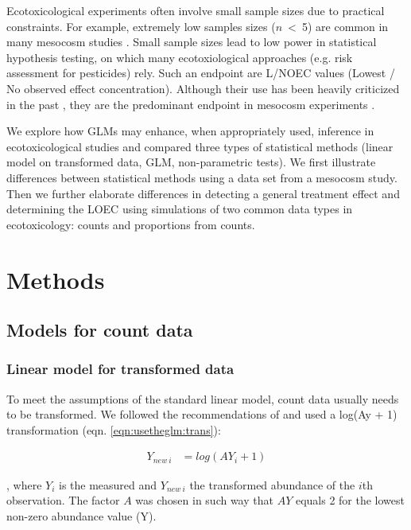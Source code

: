 Ecotoxicological experiments often involve small sample sizes due to practical constraints. 
For example, extremely low samples sizes ($n$~\textless~5) are common in many mesocosm studies \citep{sanderson_pesticide_2002,szocs_analysing_2015}.
Small sample sizes lead to low power in statistical hypothesis testing, on which many ecotoxiological approaches (e.g. risk assessment for pesticides) rely. 
Such an endpoint are L/NOEC values (Lowest / No observed effect concentration).
Although their use has been heavily criticized in the past \citep{laskowski_good_1995}, they are the predominant endpoint in mesocosm experiments \citep{brock_minimum_2015, efsa_ppr_guidance_2013}. 

We explore how GLMs may enhance, when appropriately used, inference in ecotoxicological studies and compared three types of statistical methods (linear model on transformed data, GLM, non-parametric tests).
We first illustrate differences between statistical methods using a data set from a mesocosm study.
Then we further elaborate differences in detecting a general treatment effect and determining the LOEC using simulations of two common data types in ecotoxicology: counts and proportions from counts. 


\section{Methods}
\label{sec:usetheglm:methods}

\subsection{Models for count data}
\label{ssec:usetheglm:counts}
\subsubsection{Linear model for transformed data}
To meet the assumptions of the standard linear model, count data usually needs to be transformed. 
We followed the recommendations of \citet{van_den_brink_impact_2000} and used a log(Ay + 1) transformation (eqn. \ref{eqn:usetheglm:trans}):

\begin{align}
  Y_{new~i} & = log(AY_i + 1) \label{eqn:usetheglm:trans}
\end{align}

, where $Y_i$ is the measured and $Y_{new~i}$ the transformed abundance of the $i$th observation. 
The factor $A$ was chosen in such way that $AY$ equals 2 for the lowest non-zero abundance value (Y).

